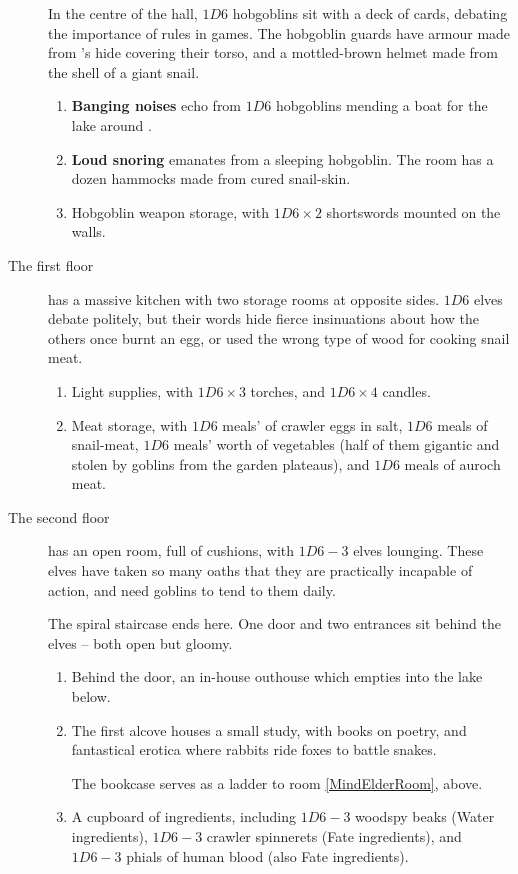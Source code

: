 \begin{multicols}{2}
\begin{description}
  In the centre of the hall, $1D6$ hobgoblins sit with a deck of cards, debating the importance of rules in games.
  The hobgoblin guards have \gls{armour} made from 's hide \gls{covering} their torso, and a mottled-brown helmet made from the shell of a giant snail.
  \begin{enumerate}
    \item
    \textbf{Banging noises} echo from $1D6$ hobgoblins mending a boat for the lake around .
    \item
    \textbf{Loud snoring} emanates from a sleeping hobgoblin.
    The room has a dozen hammocks made from cured snail-skin.
    \item
    Hobgoblin weapon storage, with $1D6 \times 2$ shortswords mounted on the walls.
    \label{towerWeaponStorage}
  \end{enumerate}
  \item[The first floor]\label{towerKitchen}
  has a massive kitchen with two storage rooms at opposite sides.
  $1D6$ elves debate politely, but their words hide fierce insinuations about how the others once burnt an egg, or used the wrong type of wood for cooking snail meat.
  \begin{enumerate}
    \item
    Light supplies, with $1D6 \times 3$ torches, and $1D6 \times 4$ candles.
    \item
    Meat storage, with $1D6$ meals' of \gls{crawler} eggs in salt, $1D6$ meals of snail-meat, $1D6$ meals' worth of vegetables (half of them gigantic and stolen by goblins from the garden plateaus), and $1D6$ meals of auroch meat.
  \end{enumerate}
  \item[The second floor]
  has an open room, full of cushions, with $1D6-3$ elves lounging.
  These elves have taken so many oaths that they are practically incapable of action, and need goblins to tend to them daily.

  The spiral staircase ends here.
  One door and two entrances sit behind the elves -- both open but gloomy.
  \begin{enumerate}
    \item
    Behind the door, an in-house outhouse which empties into the lake below.
    \item
    The first alcove houses a small study, with books on poetry, and fantastical erotica where rabbits ride foxes to battle snakes.

    The bookcase serves as a ladder to room \ref{MindElderRoom}, above.
    \item
    A cupboard of \glspl{ingredient}, including $1D6-3$ \gls{woodspy} beaks (Water \glspl{ingredient}), $1D6-3$ \gls{crawler} spinnerets (Fate \glspl{ingredient}), and $1D6-3$ phials of human blood (also Fate \glspl{ingredient}).


\end{enumerate}
\end{description}
\end{multicols}

